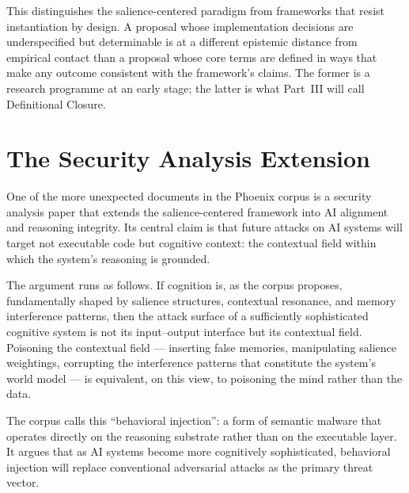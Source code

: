 This distinguishes the salience-centered paradigm from
frameworks that resist instantiation by design. A proposal
whose implementation decisions are underspecified but
determinable is at a different epistemic distance from
empirical contact than a proposal whose core terms are
defined in ways that make any outcome consistent with the
framework's claims. The former is a research programme
at an early stage; the latter is what Part~III will call
Definitional Closure.

\section{The Security Analysis Extension}
\label{sec:security-extension}

One of the more unexpected documents in the Phoenix corpus
is a security analysis paper that extends the salience-centered
framework into AI alignment and reasoning integrity. Its
central claim is that future attacks on AI systems will target
not executable code but cognitive context: the contextual
field within which the system's reasoning is grounded.

The argument runs as follows. If cognition is, as the corpus
proposes, fundamentally shaped by salience structures,
contextual resonance, and memory interference patterns, then
the attack surface of a sufficiently sophisticated cognitive
system is not its input--output interface but its contextual
field. Poisoning the contextual field --- inserting false
memories, manipulating salience weightings, corrupting the
interference patterns that constitute the system's world
model --- is equivalent, on this view, to poisoning the
mind rather than the data.

The corpus calls this ``behavioral injection'': a form of
semantic malware that operates directly on the reasoning
substrate rather than on the executable layer. It argues
that as AI systems become more cognitively sophisticated,
behavioral injection will replace conventional adversarial
attacks as the primary threat vector.



